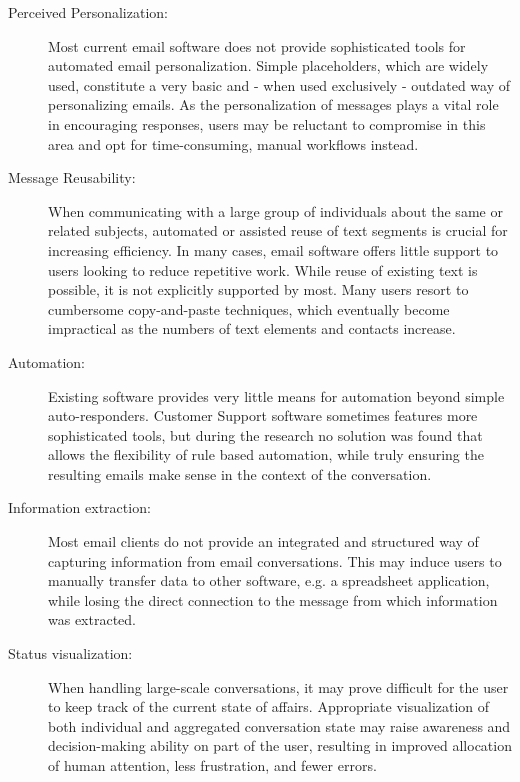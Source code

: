 \begin{description}

\item[Perceived Personalization:] Most current email software does not provide sophisticated tools for automated email personalization. Simple placeholders, which are widely used, constitute a very basic and - when used exclusively - outdated way of personalizing emails. As the personalization of messages plays a vital role in encouraging responses\citep{SCHAEFER01111998}, users may be reluctant to compromise in this area and opt for time-consuming, manual workflows instead. \citep{Joinson2007}

\item[Message Reusability:] When communicating with a large group of individuals about the same or related subjects, automated or assisted reuse of text segments is crucial for increasing efficiency. In many cases, email software offers little support to users looking to reduce repetitive work. While reuse of existing text is possible, it is not explicitly supported by most. Many users resort to cumbersome copy-and-paste techniques, which eventually become impractical as the numbers of text elements and contacts increase.

\item[Automation:] Existing software provides very little means for automation beyond simple auto-responders. Customer Support software sometimes features more sophisticated tools, but during the research no solution was found that allows the flexibility of rule based automation, while truly ensuring the resulting emails make sense in the context of the conversation.

\item[Information extraction:] Most email clients do not provide an integrated and structured way of capturing information from email conversations. This may induce users to manually transfer data to other software, e.g. a spreadsheet application, while losing the direct connection to the message from which information was extracted.

\item[Status visualization:] When handling large-scale conversations, it may prove difficult for the user to keep track of the current state of affairs. Appropriate visualization of both individual and aggregated conversation state may raise awareness and decision-making ability on part of the user, resulting in improved allocation of human attention, less frustration, and fewer errors.

\end{description}

